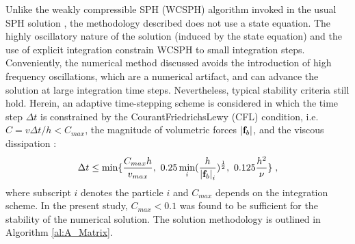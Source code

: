 Unlike the weakly compressible SPH (WCSPH) algorithm invoked in the usual SPH solution \cite{Monaghan2005a}, the methodology described does not use a state equation. The highly oscillatory nature of the solution (induced by the state equation) and the use of explicit integration constrain WCSPH to small integration steps. Conveniently, the numerical method discussed avoids the introduction of high frequency oscillations, which are a numerical artifact, and can advance the solution at large integration time steps. Nevertheless, typical stability criteria still hold. Herein, an adaptive time-stepping scheme is considered in which the time step $\Delta t$ is constrained by the Courant\-Friedrichs\-Lewy (CFL) condition, i.e. $C= v \Delta t / h < C_{max}$, the magnitude of volumetric forces $\left | {\bf f}_b \right |$, and the viscous dissipation \cite{Monaghan1992,Morris1997}:
\begin{equation}
\label{eq:delta_t}
\Delta t \leq \min \{ 
\frac{C_{max} h}{v_{max}},~ 
0.25 \min_i(\frac{h}{\left | {\bf f}_b \right |_i})^{\frac{1}{2}},~
0.125 \frac{h^{2}}{\nu}
\} \; ,
\end{equation}
where subscript $i$ denotes the particle $i$ and $C_{max}$ depends on the integration scheme.  In the present study, $C_{max}<0.1$ was found to be sufficient for the stability of the numerical solution. The solution methodology is outlined in Algorithm \ref{al:A_Matrix}. 

